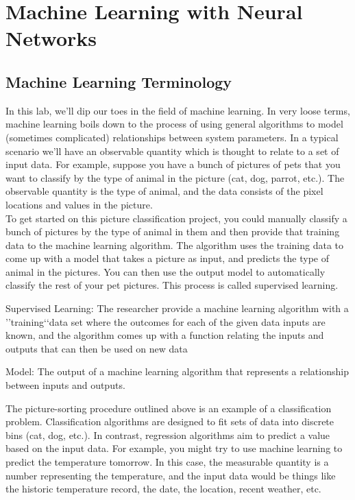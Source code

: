
\chapter*{Machine Learning with Neural Networks}

\section*{Machine Learning Terminology}
In this lab, we\rq ll dip our toes in the field of machine learning. In very loose terms, machine learning boils down to the process of using general algorithms to model (sometimes complicated) relationships between system parameters. In a typical scenario we\rq ll have an observable quantity which is thought to relate to a set of input data. For example, suppose you have a bunch of pictures of pets that you want to classify by the type of animal in the picture (cat, dog, parrot, etc.). The observable quantity is the type of animal, and the data consists of the pixel locations and values in the picture.\\

To get started on this picture classification project, you could manually classify a bunch of pictures by the type of animal in them and then provide that training data to the machine learning algorithm. The algorithm uses the training data to come up with a model that takes a picture as input, and predicts the type of animal in the pictures. You can then use the output model to automatically classify the rest of your pet pictures. This process is called supervised learning.

Supervised Learning: The researcher provide a machine learning algorithm with a \rq\rq training\lq\lq data set where the outcomes for each of the given data inputs are known, and the algorithm comes up with a function relating the inputs and outputs that can then be used on new data

Model: The output of a machine learning algorithm that represents a relationship between inputs and outputs.

The picture-sorting procedure outlined above is an example of a classification problem. Classification algorithms are designed to fit sets of data into discrete bins (cat, dog, etc.). In contrast, regression algorithms aim to predict a value based on the input data. For example, you might try to use machine learning to predict the temperature tomorrow. In this case, the measurable quantity is a number representing the temperature, and the input data would be things like the historic temperature record, the date, the location, recent weather, etc.

